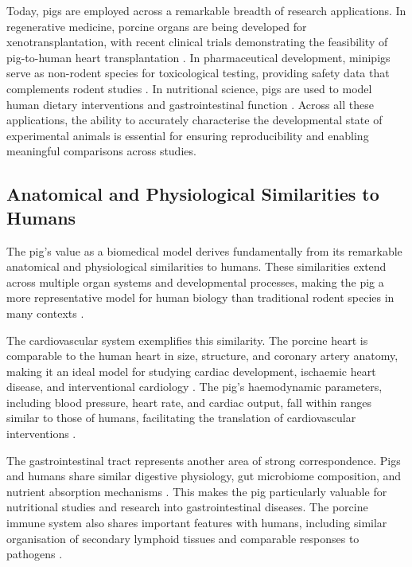Today, pigs are employed across a remarkable breadth of research applications. In regenerative medicine, porcine organs are being developed for xenotransplantation, with recent clinical trials demonstrating the feasibility of pig-to-human heart transplantation \parencite{lunney_importance_2021}. In pharmaceutical development, minipigs serve as non-rodent species for toxicological testing, providing safety data that complements rodent studies \parencite{swindle_swine_2012}. In nutritional science, pigs are used to model human dietary interventions and gastrointestinal function \parencite{pluske_gastrointestinal_2018}. Across all these applications, the ability to accurately characterise the developmental state of experimental animals is essential for ensuring reproducibility and enabling meaningful comparisons across studies.

\subsection{Anatomical and Physiological Similarities to Humans}

The pig's value as a biomedical model derives fundamentally from its remarkable anatomical and physiological similarities to humans. These similarities extend across multiple organ systems and developmental processes, making the pig a more representative model for human biology than traditional rodent species in many contexts \parencite{lunney_importance_2021}.

The cardiovascular system exemplifies this similarity. The porcine heart is comparable to the human heart in size, structure, and coronary artery anatomy, making it an ideal model for studying cardiac development, ischaemic heart disease, and interventional cardiology \parencite{swindle_swine_2012}. The pig's haemodynamic parameters, including blood pressure, heart rate, and cardiac output, fall within ranges similar to those of humans, facilitating the translation of cardiovascular interventions \parencite{galbas_cardiac_2024, hannon_normal_1990, lelovas_comparative_2014}.

The gastrointestinal tract represents another area of strong correspondence. Pigs and humans share similar digestive physiology, gut microbiome composition, and nutrient absorption mechanisms \parencite{pluske_gastrointestinal_2018}. This makes the pig particularly valuable for nutritional studies and research into gastrointestinal diseases. The porcine immune system also shares important features with humans, including similar organisation of secondary lymphoid tissues and comparable responses to pathogens \parencite{mair_porcine_2014}.


